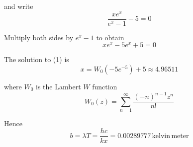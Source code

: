 and write
\begin{equation*}
\frac{xe^x}{e^x-1}-5=0
\end{equation*}

Multiply both sides by $e^x-1$ to obtain
\begin{equation*}
xe^x-5e^x+5=0
\tag{1}
\end{equation*}

The solution to (1) is
\begin{equation*}
x=W_0(-5e^{-5})+5\approx4.96511
\end{equation*}

where $W_0$ is the Lambert $W$ function
\begin{equation*}
W_0(z)=\sum_{n=1}^\infty\frac{(-n)^{n-1}z^n}{n!}
\end{equation*}

Hence
\begin{equation*}
b=\lambda T=\frac{hc}{kx}=0.00289777\,\text{kelvin}\,\text{meter}
\end{equation*}





